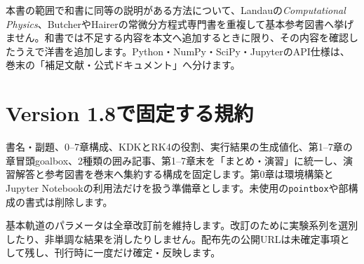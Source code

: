 \documentclass[10pt,openany]{book}
\begin{document}
本書の範囲で和書に同等の説明がある方法について、Landauの\textit{Computational Physics}、ButcherやHairerの常微分方程式専門書を重複して基本参考図書へ挙げません。和書では不足する内容を本文へ追加するときに限り、その内容を確認したうえで洋書を追加します。Python・NumPy・SciPy・JupyterのAPI仕様は、巻末の「補足文献・公式ドキュメント」へ分けます。

\section{Version 1.8で固定する規約}
書名・副題、0--7章構成、KDKとRK4の役割、実行結果の生成値化、第1--7章の章冒頭goalbox、2種類の囲み記事、第1--7章末を「まとめ・演習」に統一し、演習解答と参考図書を巻末へ集約する構成を固定します。第0章は環境構築とJupyter Notebookの利用法だけを扱う準備章とします。未使用の\texttt{pointbox}や部構成の書式は削除します。

基本軌道のパラメータは全章改訂前を維持します。改訂のために実験系列を選別したり、非単調な結果を消したりしません。配布先の公開URLは未確定事項として残し、刊行時に一度だけ確定・反映します。
\end{document}
